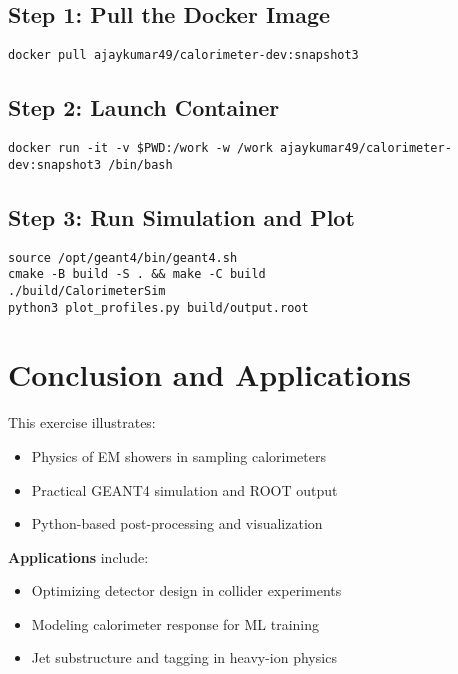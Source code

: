 \documentclass[11pt]{article}
\begin{document}
\subsection*{Step 1: Pull the Docker Image}
\begin{verbatim}
docker pull ajaykumar49/calorimeter-dev:snapshot3
\end{verbatim}

\subsection*{Step 2: Launch Container}
\begin{verbatim}
docker run -it -v $PWD:/work -w /work ajaykumar49/calorimeter-dev:snapshot3 /bin/bash
\end{verbatim}

\subsection*{Step 3: Run Simulation and Plot}
\begin{verbatim}
source /opt/geant4/bin/geant4.sh
cmake -B build -S . && make -C build
./build/CalorimeterSim
python3 plot_profiles.py build/output.root
\end{verbatim}

\section{Conclusion and Applications}

This exercise illustrates:
\begin{itemize}
  \item Physics of EM showers in sampling calorimeters
  \item Practical GEANT4 simulation and ROOT output
  \item Python-based post-processing and visualization
\end{itemize}

\textbf{Applications} include:
\begin{itemize}
  \item Optimizing detector design in collider experiments
  \item Modeling calorimeter response for ML training
  \item Jet substructure and tagging in heavy-ion physics
\end{itemize}
\end{document}
